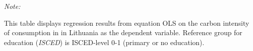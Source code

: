 \begin{table}[htbp!]
\begin{adjustbox}{width = 1\textwidth, max height = 0.95\textheight, center}
\begin{threeparttable}[b]
         \begin{tablenotes}\item \medskip \textit{Note:}
            \item This table displays regression results from equation OLS on the carbon intensity of consumption in  in Lithuania as the dependent variable. Reference group for education (\textit{ISCED}) is ISCED-level 0-1 (primary or no education).
         \end{tablenotes}
      \end{threeparttable}
   \end{adjustbox}
\end{table}


